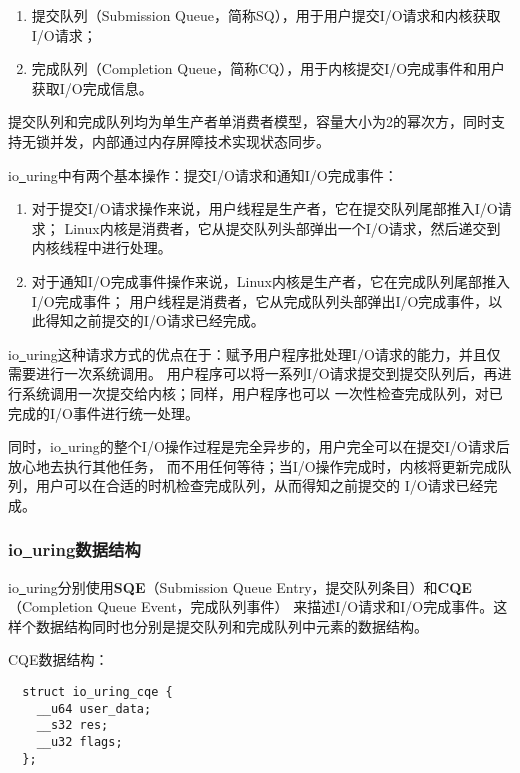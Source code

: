\documentclass[supercite]{HustGraduPaper}
\theoremstyle{definition}
\begin{document}
\begin{enumerate}
  \item 提交队列（Submission Queue，简称SQ），用于用户提交I/O请求和内核获取I/O请求；
  \item 完成队列（Completion Queue，简称CQ），用于内核提交I/O完成事件和用户获取I/O完成信息。
\end{enumerate}

提交队列和完成队列均为单生产者单消费者模型，容量大小为2的幂次方，同时支持无锁并发，内部通过内存屏障技术实现状态同步。\par

io\underline{~}uring中有两个基本操作：提交I/O请求和通知I/O完成事件：
\begin{enumerate}
  \item 对于提交I/O请求操作来说，用户线程是生产者，它在提交队列尾部推入I/O请求；
    Linux内核是消费者，它从提交队列头部弹出一个I/O请求，然后递交到内核线程中进行处理。
  \item 对于通知I/O完成事件操作来说，Linux内核是生产者，它在完成队列尾部推入I/O完成事件；
    用户线程是消费者，它从完成队列头部弹出I/O完成事件，以此得知之前提交的I/O请求已经完成。
\end{enumerate}

io\underline{~}uring这种请求方式的优点在于：赋予用户程序批处理I/O请求的能力，并且仅需要进行一次系统调用。
用户程序可以将一系列I/O请求提交到提交队列后，再进行系统调用一次提交给内核；同样，用户程序也可以
一次性检查完成队列，对已完成的I/O事件进行统一处理。\par

同时，io\underline{~}uring的整个I/O操作过程是完全异步的，用户完全可以在提交I/O请求后放心地去执行其他任务，
而不用任何等待；当I/O操作完成时，内核将更新完成队列，用户可以在合适的时机检查完成队列，从而得知之前提交的
I/O请求已经完成。\par

\subsubsection{io\underline{~}uring数据结构}
io\underline{~}uring分别使用\textbf{SQE}（Submission Queue Entry，提交队列条目）和\textbf{CQE}（Completion Queue Event，完成队列事件）
来描述I/O请求和I/O完成事件。这样个数据结构同时也分别是提交队列和完成队列中元素的数据结构。\par

CQE数据结构：

\begin{lstlisting}
  struct io_uring_cqe {
    __u64 user_data;
    __s32 res;
    __u32 flags;
  };
\end{lstlisting}
\end{document}
